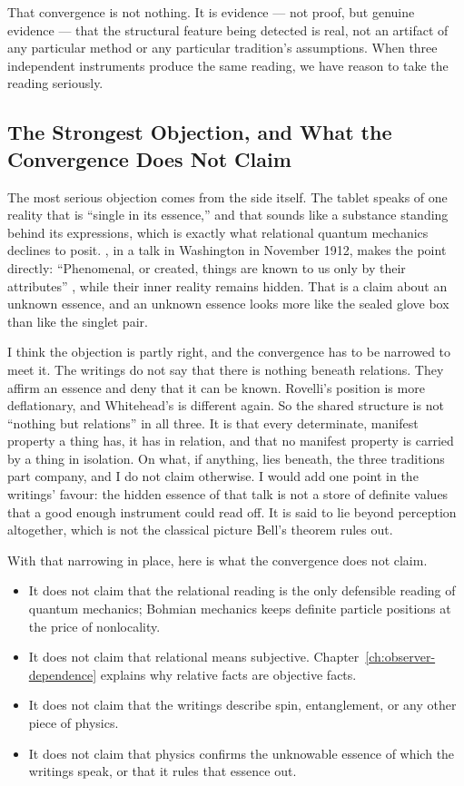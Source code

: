 That convergence is not nothing. It is evidence --- not proof, but genuine evidence --- that the structural feature being detected is real, not an artifact of any particular method or any particular tradition's assumptions. When three independent instruments produce the same reading, we have reason to take the reading seriously.

\subsection*{The Strongest Objection, and What the Convergence Does Not Claim}

The most serious objection comes from the \bahai side itself. The tablet speaks of one reality that is ``single in its essence,'' and that sounds like a substance standing behind its expressions, which is exactly what relational quantum mechanics declines to posit. \AbdulBaha, in a talk in Washington in November 1912, makes the point directly: ``Phenomenal, or created, things are known to us only by their attributes'' \citep[Talk 125]{PUP}, while their inner reality remains hidden. That is a claim about an unknown essence, and an unknown essence looks more like the sealed glove box than like the singlet pair.

I think the objection is partly right, and the convergence has to be narrowed to meet it. The writings do not say that there is nothing beneath relations. They affirm an essence and deny that it can be known. Rovelli's position is more deflationary, and Whitehead's is different again. So the shared structure is not ``nothing but relations'' in all three. It is that every determinate, manifest property a thing has, it has in relation, and that no manifest property is carried by a thing in isolation. On what, if anything, lies beneath, the three traditions part company, and I do not claim otherwise. I would add one point in the writings' favour: the hidden essence of that talk is not a store of definite values that a good enough instrument could read off. It is said to lie beyond perception altogether, which is not the classical picture Bell's theorem rules out.

With that narrowing in place, here is what the convergence does not claim.

\begin{itemize}
\item It does not claim that the relational reading is the only defensible reading of quantum mechanics; Bohmian mechanics keeps definite particle positions at the price of nonlocality.
\item It does not claim that relational means subjective. Chapter~\ref{ch:observer-dependence} explains why relative facts are objective facts.
\item It does not claim that the \bahai writings describe spin, entanglement, or any other piece of physics.
\item It does not claim that physics confirms the unknowable essence of which the writings speak, or that it rules that essence out.
\end{itemize}

